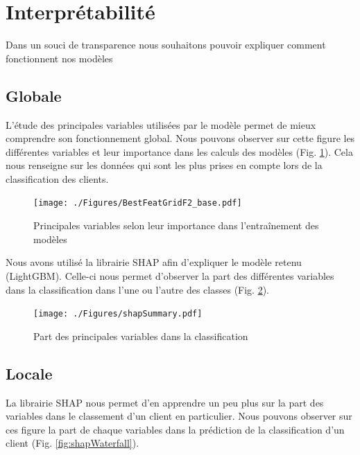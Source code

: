 \documentclass[12pt, a4paper]{article}
\begin{document}
\section{Interprétabilité}

Dans un souci de transparence nous souhaitons pouvoir expliquer comment fonctionnent nos modèles

\subsection{Globale}

L'étude des principales variables utilisées par le modèle permet de mieux comprendre son fonctionnement global.
Nous pouvons observer sur cette figure les différentes variables et leur importance dans les calculs des modèles (Fig. \ref{fig:BestFeat}).
Cela nous renseigne sur les données qui sont les plus prises en compte lors de la classification des clients.

\begin{figure}[h]
    \begin{center}
        \texttt{[image: ./Figures/BestFeatGridF2\_base.pdf]}
    \end{center}
    \caption{Principales variables selon leur importance dans l'entraînement des modèles}
    \label{fig:BestFeat}
\end{figure}

Nous avons utilisé la librairie SHAP afin d'expliquer le modèle retenu (LightGBM). Celle-ci nous permet d'observer la part des différentes variables dans la classification dans l'une ou l'autre des classes (Fig. \ref{fig:shapSummary}).

\begin{figure}[h]
    \begin{center}
        \texttt{[image: ./Figures/shapSummary.pdf]}
    \end{center}
    \caption{Part des principales variables dans la classification}
    \label{fig:shapSummary}
\end{figure}

\subsection{Locale}

La librairie SHAP nous permet d'en apprendre un peu plus sur la part des variables dans le classement d'un client en particulier.
Nous pouvons observer sur ces figure la part de chaque variables dans la prédiction de la classification d'un client (Fig. \ref{fig:shapWaterfall}).
\end{document}
